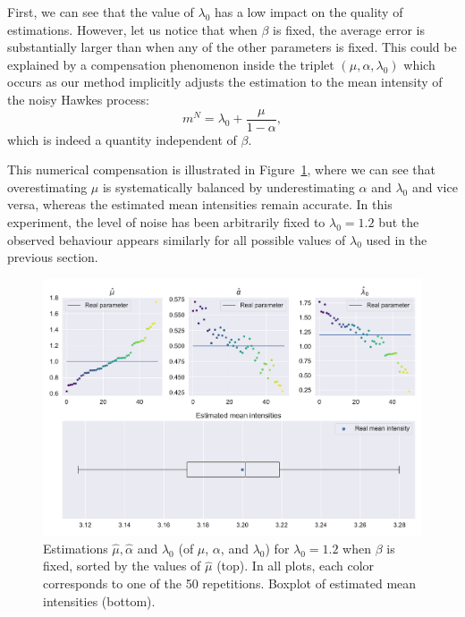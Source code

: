 		First, we can see that the value of $\lambda_0$ has a low impact on the quality of estimations.
   However, let us notice that when $\beta$ is fixed, the average error is substantially larger than when any of the other parameters is fixed.
     This could be explained by a compensation phenomenon inside the triplet $(\mu, \alpha,\lambda_0)$ which occurs as our method implicitly adjusts the estimation to the mean intensity of the noisy Hawkes process: 
     \[m^N = \lambda_0 + \frac{\mu}{1-\alpha},\]
     which is indeed a quantity independent of $\beta$.
    
    This numerical compensation is illustrated in Figure~\ref{fig:chap4_uni_compensation_beta_N}, where we can see that overestimating $\mu$ is systematically balanced by underestimating $\alpha$ and $\lambda_0$ and vice versa, whereas the estimated mean intensities remain accurate.
    In this experiment, the level of noise has been arbitrarily fixed to $\lambda_0 = 1.2$ but the observed behaviour appears similarly for all possible values of $\lambda_0$ used in the previous section.

    
    \begin{figure}[!ht]
        \centering
        \includegraphics[width=\textwidth]{images/chapter4//compensation_beta_N.pdf}
        \caption{Estimations $\hat \mu, \hat \alpha$ and $\hat \lambda_0$ (of $\mu$, $\alpha$, and $\lambda_0$) for
        $\lambda_0 = 1.2$ when $\beta$ is fixed,
        sorted by the values of $\hat{\mu}$ (top).
        In all plots, each color corresponds to one of the 50 repetitions. Boxplot of estimated mean intensities (bottom).}
        \label{fig:chap4_uni_compensation_beta_N}
        \end{figure}

